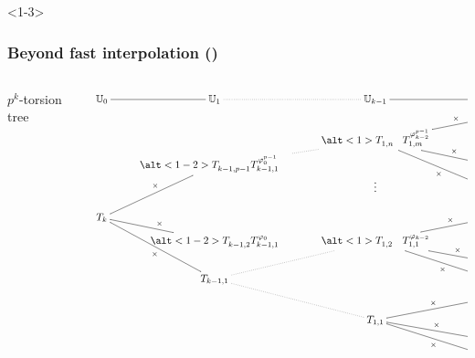 \documentclass[10pt]{beamer}
\newcommand{\U}{\mathbb{U}}  %
\newcommand{\frob}{\varphi}  %
\newcommand{\0}{\mathcal{O}}  %
\begin{document}
\begin{frame}<1-3>
  \frametitle{Beyond fast interpolation (\cite{DF07})}
  
  \footnotesize

  \begin{columns}
    \begin{column}{0.2\textwidth}
      \normalsize
      $p^k$-torsion tree
    \end{column}
    \begin{column}{0.8\textwidth}
      \tiny
      \vspace{-3mm}

      \[\xymatrix@R=0pt@C=25pt{
	{\U_0 \ar@{-}[r]} & {\U_1 \ar@{.}[r]} &
	{\U_{k-1} \ar@{-}[r]} & {\U_k}
	\\
	& & & **[r](X - P_n)^{\frob^{p-1}_{k-1}}\ar@{-}"3,3"_-{\times} \\
	& & \alt<1>{T_{1,n}^{\phantom{\frob_{k-2}^{p-1}}}}{T_{1,m}^{\frob_{k-2}^{p-1}}}\ar@{.}"4,2" & {\vdots} \\
	& \alt<1-2>{T_{k-1,p-1}^{\phantom{\frob_0^{p-1}}}}{T_{k-1,1\phantom{-p}}^{\frob_0^{p-1}}}\ar@{-}"7,1"_{\times} & & **[r](X-P_n)^{\frob_{k-1}}\ar@{-}"3,3"_-{\times} \\
	& & {\vdots} & **[r](X - P_n)\ar@{-}"3,3"^-{\times} \\
	& & & \\
    T_k & & & **[r](X - P_2)^{\frob^{p-1}_{k-1}}\ar@{-}"8,3"_-{\times} \\
	& \alt<1-2>{T_{k-1,2}^{\phantom{\frob_0}}}{T_{k-1,1}^{\frob_0}}\ar@{-}"7,1"_{\times} & \alt<1>{T_{1,2}^{\phantom{\frob_{k-2}}}}{T_{1,1}^{\frob_{k-2}}}\ar@{.}"10,2" & {\vdots} \\
	& & & **[r](X-P_2)^{\frob_{k-1}}\ar@{-}"8,3"_-{\times}  \\
	& T_{k-1,1}\ar@{-}"7,1"^{\times} & & **[r](X - P_2)\ar@{-}"8,3"^-{\times} \\
	& & & **[r](X - P_1)^{\frob^{p-1}_{k-1}}\ar@{-}"12,3"_-{\times}  \\
	& & T_{1,1}\ar@{.}"10,2" & {\vdots} \\
	& & & **[r](X - P_1)^{\frob_{k-1}}\ar@{-}"12,3"_-{\times} \\
	& & & **[r](X - P_1)\ar@{-}"12,3"^-{\times}
      }\]
    \end{column}
  \end{columns}
\end{frame}

\end{document}
